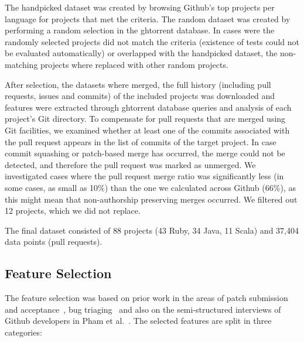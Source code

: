 \documentclass{sig-alternate}
\begin{document}
The \textsf{handpicked} dataset was created by browsing Github's top projects
per language for projects that met the criteria. The \textsf{random} dataset
was created by performing a random selection in the {\sc ght}orrent database. In
cases were the randomly selected projects did not match the criteria (existence
of tests could not be evaluated automatically) or overlapped with the
\textsf{handpicked} dataset, the non-matching projects where replaced with
other random projects. 

After selection, the datasets where merged, the full history (including pull
requests, issues and commits) of the included projects was downloaded and
features were extracted through {\sc ght}orrent database queries and analysis of
each project's Git directory. To compensate for pull requests that are merged
using Git facilities, we examined whether at least one of the commits associated
with the pull request appears in the list of commits of the target project. In
case commit squashing or patch-based merge has occurred, the merge could not be
detected, and therefore the pull request was marked as unmerged. We investigated
cases where the pull request merge ratio was significantly less (in some cases,
as small as 10\%) than the one we calculated across Github (66\%), as this might
mean that non-authorship preserving merges occurred. We filtered out 12
projects, which we did not replace. 

The final dataset consisted of 88 projects (43 Ruby, 34 Java, 11 Scala)
and 37,404 data points (pull requests).

\subsection{Feature Selection}

The feature selection was based on prior work in the areas of patch submission
and acceptance~\cite{Nagap05,Bird07a,Weiss08,Jeong09,Baysa12}, bug
triaging~\cite{Anvik06, Giger10} and also on the semi-structured interviews of
Github developers in Pham et al.~\cite{Pham13}. The selected features are split
in three categories:
\end{document}
